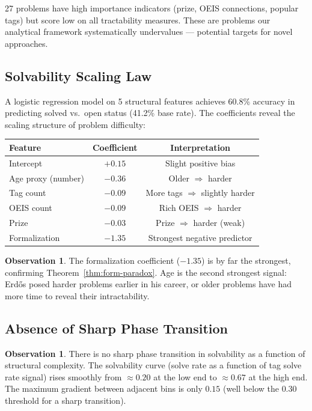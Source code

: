 \documentclass[11pt,a4paper]{article}
\theoremstyle{definition}
\newtheorem{observation}[theorem]{Observation}
\theoremstyle{remark}
\begin{document}
27 problems have high importance indicators (prize, OEIS connections, popular
tags) but score low on all tractability measures. These are problems our
analytical framework systematically undervalues --- potential targets for
novel approaches.

\subsection{Solvability Scaling Law}

A logistic regression model on 5 structural features achieves 60.8\% accuracy
in predicting solved vs.\ open status (41.2\% base rate). The coefficients
reveal the scaling structure of problem difficulty:

\begin{center}
\begin{tabular}{lcc}
\toprule
Feature & Coefficient & Interpretation \\
\midrule
Intercept & $+0.15$ & Slight positive bias \\
Age proxy (number) & $-0.36$ & Older $\Rightarrow$ harder \\
Tag count & $-0.09$ & More tags $\Rightarrow$ slightly harder \\
OEIS count & $-0.09$ & Rich OEIS $\Rightarrow$ harder \\
Prize & $-0.03$ & Prize $\Rightarrow$ harder (weak) \\
Formalization & $-1.35$ & Strongest negative predictor \\
\bottomrule
\end{tabular}
\end{center}

\begin{observation}
The formalization coefficient ($-1.35$) is by far the strongest, confirming
Theorem~\ref{thm:form-paradox}. Age is the second strongest signal: Erd\H{o}s
posed harder problems earlier in his career, or older problems have had more
time to reveal their intractability.
\end{observation}

\subsection{Absence of Sharp Phase Transition}

\begin{observation}
There is no sharp phase transition in solvability as a function of structural
complexity. The solvability curve (solve rate as a function of tag solve rate
signal) rises smoothly from $\approx 0.20$ at the low end to $\approx 0.67$
at the high end. The maximum gradient between adjacent bins is only $0.15$
(well below the $0.30$ threshold for a sharp transition).
\end{observation}
\end{document}
